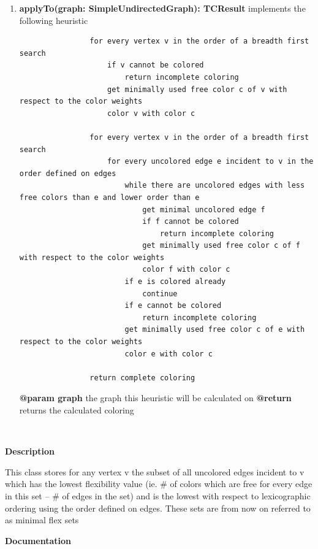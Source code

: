 	\begin{enumerate}[+]
		\item{
			\textbf{applyTo(graph: SimpleUndirectedGraph): TCResult} \newline
			implements the following heuristic
			
			\begin{verbatim}
				for every vertex v in the order of a breadth first search
				    if v cannot be colored
				        return incomplete coloring
				    get minimally used free color c of v with respect to the color weights
				    color v with color c
				    
				for every vertex v in the order of a breadth first search
				    for every uncolored edge e incident to v in the order defined on edges
				        while there are uncolored edges with less free colors than e and lower order than e
				            get minimal uncolored edge f
				            if f cannot be colored
				                return incomplete coloring
				            get minimally used free color c of f with respect to the color weights
				            color f with color c
				        if e is colored already
				            continue
				        if e cannot be colored
				            return incomplete coloring
				        get minimally used free color c of e with respect to the color weights
				        color e with color c
				        
				return complete coloring
			\end{verbatim}
			
			\textbf{@param graph} the graph this heuristic will be calculated on \newline
			\textbf{@return} returns the calculated coloring
		}
	\end{enumerate}
	
	~\newpage
	
	
	\textbf{Description}
	
	This class stores for any vertex v the subset of all uncolored edges incident to v which has the lowest flexibility value (ie. \# of colors which are free for every edge in this set -- \# of edges in the set) and is the lowest with respect to lexicographic ordering using the order defined on edges. These sets are from now on referred to as minimal flex sets
		
	\textbf{Documentation}
	

